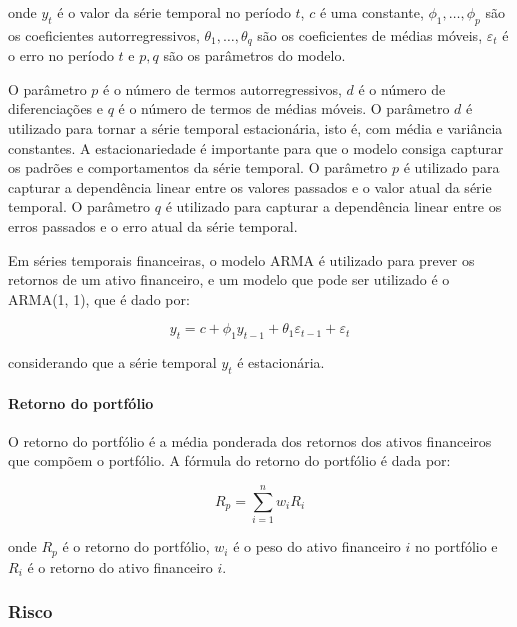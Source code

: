                 \noindent onde $y_t$ é o valor da série temporal no período $t$, $c$ é uma constante, $\phi_1, \ldots, \phi_p$ são os coeficientes autorregressivos, $\theta_1, \ldots, \theta_q$ são os coeficientes de médias móveis, $\varepsilon_t$ é o erro no período $t$ e $p, q$ são os parâmetros do modelo.

                \ipar O parâmetro $p$ é o número de termos autorregressivos, $d$ é o número de diferenciações e $q$ é o número de termos de médias móveis. O parâmetro $d$ é utilizado para tornar a série temporal estacionária, isto é, com média e variância constantes. A estacionariedade é importante para que o modelo consiga capturar os padrões e comportamentos da série temporal. O parâmetro $p$ é utilizado para capturar a dependência linear entre os valores passados e o valor atual da série temporal. O parâmetro $q$ é utilizado para capturar a dependência linear entre os erros passados e o erro atual da série temporal.

                \ipar Em séries temporais financeiras, o modelo ARMA é utilizado para prever os retornos de um ativo financeiro, e um modelo que pode ser utilizado é o ARMA(1, 1), que é dado por:

                \begin{equation}
                    y_t = c + \phi_1 y_{t-1} + \theta_1 \varepsilon_{t-1} + \varepsilon_t
                \end{equation}

                \noindent considerando que a série temporal $y_t$ é estacionária.

            \paragraph{Retorno do portfólio}

                \ipar O retorno do portfólio é a média ponderada dos retornos dos ativos financeiros que compõem o portfólio. A fórmula do retorno do portfólio é dada por:

                \begin{equation}
                    R_p = \sum_{i=1}^{n} w_i R_i
                \end{equation}

                \noindent onde $R_p$ é o retorno do portfólio, $w_i$ é o peso do ativo financeiro $i$ no portfólio e $R_i$ é o retorno do ativo financeiro $i$. 

        \subsubsection{Risco}

